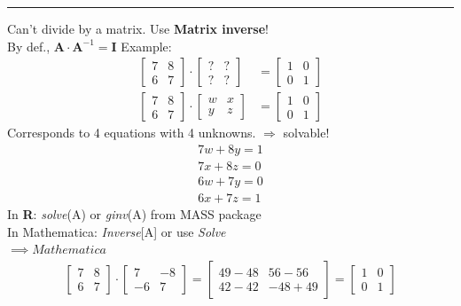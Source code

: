 \documentclass{article}
\newcommand{\note}[1]{\colorbox{gray!30}{#1}}
\newcommand{\ind}{\-\hspace{1cm}}
\begin{document}
\rule[0.5ex]{\linewidth}{1pt}
Can't divide by a matrix.  Use \textbf{Matrix inverse}!\\
\ind By def., $\mathbf{A}\cdot \mathbf{A}^{-1}=\mathbf{I}$
Example:
\begin{align*}
	\begin{bmatrix} 7 & 8 \\ 6 & 7 \end{bmatrix} \cdot \begin{bmatrix} ? & ? \\ ? & ? \end{bmatrix}& = \begin{bmatrix}1 & 0\\0 & 1 \end{bmatrix}\\
	\begin{bmatrix} 7 & 8 \\ 6 & 7 \end{bmatrix} \cdot \begin{bmatrix} w & x \\ y & z \end{bmatrix} &= \begin{bmatrix}1 & 0\\0 & 1 \end{bmatrix}
\end{align*}
Corresponds to 4 equations with 4 unknowns.  $\Rightarrow$ solvable!
\begin{align*}
	7 w + 8 y = 1\\
	7 x + 8 z = 0\\
	6 w + 7 y = 0\\
	6 x + 7 z = 1
\end{align*}
In \textbf{R}: \emph{solve}(A) or \emph{ginv}(A) from MASS package\\
In Mathematica: \emph{Inverse}[A] or use \emph{Solve}\\  \note{$\implies Mathematica$}
\begin{align*}
	\begin{bmatrix} 7 & 8 \\ 6 & 7 \end{bmatrix} \cdot \begin{bmatrix} 7 & -8 \\ -6 & 7 \end{bmatrix} =\begin{bmatrix} 49-48 & 56-56 \\ 42-42 & -48+49 \end{bmatrix}= \begin{bmatrix}1 & 0\\0 & 1 \end{bmatrix}
\end{align*}
\end{document}
